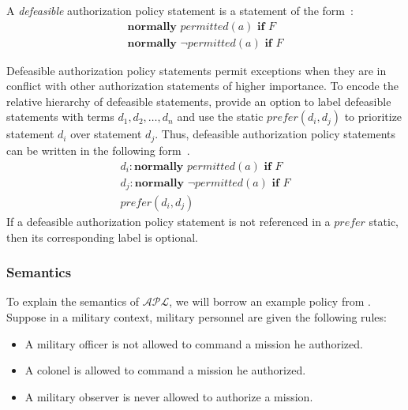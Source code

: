 \begin{definition}
    \label{def:defeasible_authorization_statements}
    A \textit{defeasible} authorization policy statement is a statement of the form~\citep{gelfond_authorization_2008}:
    \begin{gather*}
        \textbf{normally } permitted(a) \textbf{ if } F \\
        \textbf{normally } \neg permitted(a) \textbf{ if } F
    \end{gather*}
\end{definition}

Defeasible authorization policy statements permit exceptions when they are in conflict with other authorization statements of higher importance.
To encode the relative hierarchy of defeasible statements, \citet{gelfond_authorization_2008} provide an option to label defeasible statements with terms $d_1,d_2,\ldots,d_n$ and use the static $prefer\left(d_i,d_j\right)$ to prioritize statement $d_i$ over statement $d_j$.
Thus, defeasible authorization policy statements can be written in the following form~\citep{gelfond_authorization_2008}.
\begin{gather}
    d_i: \textbf{normally } permitted(a) \textbf{ if } F \\
    d_j: \textbf{normally } \neg permitted(a) \textbf{ if } F \\
    prefer(d_i, d_j)
\end{gather}
If a defeasible authorization policy statement is not referenced in a $prefer$ static, then its corresponding label is optional.

\subsubsection{Semantics}

To explain the semantics of $\mathcal{APL}$, we will borrow an example policy from \citet{gelfond_authorization_2008}.
Suppose in a military context, military personnel are given the following rules:

\begin{itemize}
    \item A military officer is not allowed to command a mission he authorized.
    \item A colonel is allowed to command a mission he authorized.
    \item A military observer is never allowed to authorize a mission.
\end{itemize}

